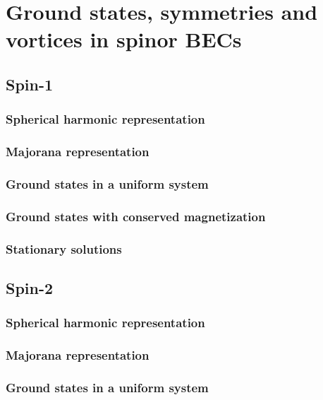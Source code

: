 \chapter{Ground states, symmetries and vortices in spinor BECs}

\section{Spin-1}

\subsection{Spherical harmonic representation}

\subsection{Majorana representation}

\subsection{Ground states in a uniform system}

\subsection{Ground states with conserved magnetization}

\subsection{Stationary solutions}

\section{Spin-2}

\subsection{Spherical harmonic representation}

\subsection{Majorana representation}

\subsection{Ground states in a uniform system}

